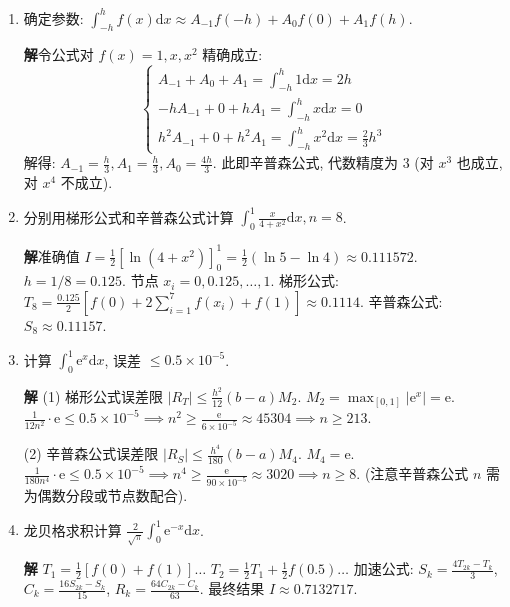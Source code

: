 \documentclass[a4paper,11pt]{ctexart}
\newcommand{\sol}{\par\noindent\textbf{解}\quad}
\newcommand{\ud}{\mathrm{d}}
\newcommand{\e}{\mathrm{e}}
\begin{document}
\begin{enumerate}[label=\textbf{4-\arabic*.}, leftmargin=*]
    \item 确定参数: $\int_{-h}^h f(x) \ud x \approx A_{-1} f(-h) + A_0 f(0) + A_1 f(h)$.
    
    \sol 令公式对 $f(x)=1, x, x^2$ 精确成立:
    \[
    \begin{cases}
    A_{-1} + A_0 + A_1 = \int_{-h}^h 1 \ud x = 2h \\
    -h A_{-1} + 0 + h A_1 = \int_{-h}^h x \ud x = 0 \\
    h^2 A_{-1} + 0 + h^2 A_1 = \int_{-h}^h x^2 \ud x = \frac{2}{3}h^3
    \end{cases}
    \]
    解得: $A_{-1} = \frac{h}{3}, A_1 = \frac{h}{3}, A_0 = \frac{4h}{3}$.
    此即辛普森公式, 代数精度为 3 (对 $x^3$ 也成立, 对 $x^4$ 不成立).

    \item[2.] 分别用梯形公式和辛普森公式计算 $\int_0^1 \frac{x}{4+x^2} \ud x, n=8$.
    
    \sol 准确值 $I = \frac{1}{2}[\ln(4+x^2)]_0^1 = \frac{1}{2}(\ln 5 - \ln 4) \approx 0.111572$.
    $h = 1/8 = 0.125$. 节点 $x_i = 0, 0.125, \dots, 1$.
    梯形公式: $T_8 = \frac{0.125}{2}[f(0) + 2\sum_{i=1}^7 f(x_i) + f(1)] \approx 0.1114$.
    辛普森公式: $S_8 \approx 0.11157$.

    \item[6.] 计算 $\int_0^1 \e^x \ud x$, 误差 $\leqslant 0.5 \times 10^{-5}$.
    
    \sol 
    (1) 梯形公式误差限 $|R_T| \leqslant \frac{h^2}{12}(b-a) M_2$.
    $M_2 = \max_{[0,1]} |\e^x| = \e$.
    $\frac{1}{12 n^2} \cdot \e \leqslant 0.5 \times 10^{-5} \implies n^2 \geqslant \frac{\e}{6 \times 10^{-5}} \approx 45304 \implies n \geqslant 213$.
    
    (2) 辛普森公式误差限 $|R_S| \leqslant \frac{h^4}{180}(b-a) M_4$.
    $M_4 = \e$.
    $\frac{1}{180 n^4} \cdot \e \leqslant 0.5 \times 10^{-5} \implies n^4 \geqslant \frac{\e}{90 \times 10^{-5}} \approx 3020 \implies n \geqslant 8$. (注意辛普森公式 $n$ 需为偶数分段或节点数配合).

    \item[8.] 龙贝格求积计算 $\frac{2}{\sqrt{\pi}} \int_0^1 \e^{-x} \ud x$.
    
    \sol
    $T_1 = \frac{1}{2}[f(0)+f(1)] \dots$
    $T_2 = \frac{1}{2}T_1 + \frac{1}{2}f(0.5) \dots$
    加速公式: $S_k = \frac{4T_{2k}-T_k}{3}$, $C_k = \frac{16S_{2k}-S_k}{15}$, $R_k = \frac{64C_{2k}-C_k}{63}$.
    最终结果 $I \approx 0.7132717$.


\end{enumerate}
\end{document}

